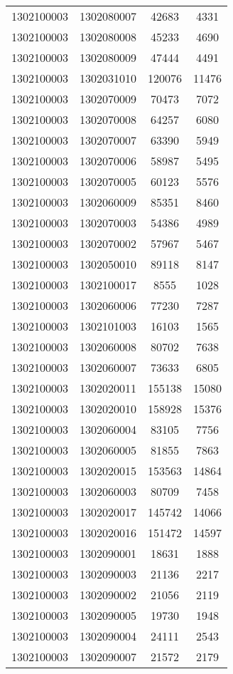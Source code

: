 \begin{longtable}[h]{llcc}
		1302100003 & 1302080007 & 42683 & 4331\\
		1302100003 & 1302080008 & 45233 & 4690\\
		1302100003 & 1302080009 & 47444 & 4491\\
		1302100003 & 1302031010 & 120076 & 11476\\
		1302100003 & 1302070009 & 70473 & 7072\\
		1302100003 & 1302070008 & 64257 & 6080\\
		1302100003 & 1302070007 & 63390 & 5949\\
		1302100003 & 1302070006 & 58987 & 5495\\
		1302100003 & 1302070005 & 60123 & 5576\\
		1302100003 & 1302060009 & 85351 & 8460\\
		1302100003 & 1302070003 & 54386 & 4989\\
		1302100003 & 1302070002 & 57967 & 5467\\
		1302100003 & 1302050010 & 89118 & 8147\\
		1302100003 & 1302100017 & 8555 & 1028\\
		1302100003 & 1302060006 & 77230 & 7287\\
		1302100003 & 1302101003 & 16103 & 1565\\
		1302100003 & 1302060008 & 80702 & 7638\\
		1302100003 & 1302060007 & 73633 & 6805\\
		1302100003 & 1302020011 & 155138 & 15080\\
		1302100003 & 1302020010 & 158928 & 15376\\
		1302100003 & 1302060004 & 83105 & 7756\\
		1302100003 & 1302060005 & 81855 & 7863\\
		1302100003 & 1302020015 & 153563 & 14864\\
		1302100003 & 1302060003 & 80709 & 7458\\
		1302100003 & 1302020017 & 145742 & 14066\\
		1302100003 & 1302020016 & 151472 & 14597\\
		1302100003 & 1302090001 & 18631 & 1888\\
		1302100003 & 1302090003 & 21136 & 2217\\
		1302100003 & 1302090002 & 21056 & 2119\\
		1302100003 & 1302090005 & 19730 & 1948\\
		1302100003 & 1302090004 & 24111 & 2543\\
		1302100003 & 1302090007 & 21572 & 2179\\

\end{longtable}
